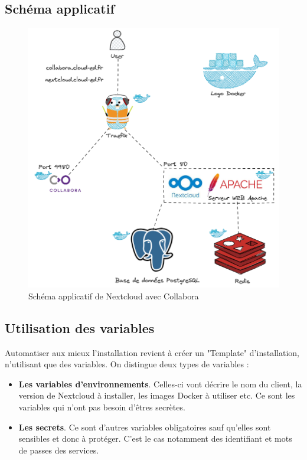 \documentclass[12pt]{article}
\begin{document}
\newpage
\subsection{Schéma applicatif}
\begin{figure}[!ht]
    \centering
    \includegraphics[width=\textwidth]{src/graph_nextcloud.png}
    \caption{Schéma applicatif de \gls{Nextcloud} avec \gls{Collabora}}
    \label{fig:nextcloudXcollabora}
\end{figure}

\newpage
\subsection{Utilisation des variables}
Automatiser aux mieux l'installation revient à créer un "Template" d'installation, n'utilisant que des variables. 
On distingue deux types de variables :
\begin{itemize}
    \item \textbf{Les variables d'environnements}. Celles-ci vont décrire le nom du client, la version de \gls{Nextcloud} à installer, les images Docker à utiliser etc. 
    Ce sont les variables qui n'ont pas besoin d'êtres secrètes.
    \item \textbf{Les secrets}. Ce sont d'autres variables obligatoires sauf qu'elles sont sensibles et donc à protéger. 
    C'est le cas notamment des identifiant et mots de passes des services.
\end{itemize}
\end{document}
